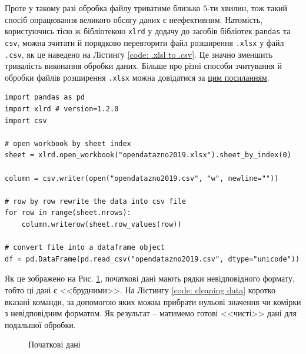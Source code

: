 \vspace{0.4cm}
Проте у такому разі обробка файлу триватиме близько $5$-ти хвилин, тож такий спосіб опрацювання великого 
обсягу даних є неефективним. Натомість, користуючись тією ж бібліотекою \texttt{xlrd} у додачу до засобів 
бібліотек \texttt{pandas} та \texttt{csv}, можна зчитати й порядково перевторити файл розширення \texttt{.xlsx} у файл \texttt{.csv}, як це наведено на Лістингу \ref{code: .xlsl to .csv}. Це значно зменшить тривалість виконання обробки даних. Більше про різні способи зчитування й обробки файлів розширення \texttt{.xlsx} можна довідатися за \href{https://linuxhint.com/read-excel-file-python/}{цим посиланням}.

\newpage
\begin{lstlisting}[firstnumber=16, label = code: .xlsl to .csv, caption = Конвертація у \texttt{.csv} файл]
import pandas as pd
import xlrd # version=1.2.0
import csv
    
# open workbook by sheet index
sheet = xlrd.open_workbook("opendatazno2019.xlsx").sheet_by_index(0)
    
column = csv.writer(open("opendatazno2019.csv", "w", newline=""))
    
# row by row rewrite the data into csv file
for row in range(sheet.nrows):
    column.writerow(sheet.row_values(row))
    
# convert file into a dataframe object
df = pd.DataFrame(pd.read_csv("opendatazno2019.csv", dtype="unicode"))
\end{lstlisting}

\vspace{0.4cm}
Як це зображено на Рис. \ref{figure: initial data}, початкові дані мають рядки невідповідного формату, 
тобто ці дані є <<брудними>>. На Лістингу \ref{code: cleaning data} коротко вказані команди, за допомогою 
яких можна прибрати нульові значення чи комірки з невідповідним форматом. Як результат -- матимемо готові 
<<чисті>> дані для подальшої обробки. 

\begin{figure}[H]
    \caption{Початкові дані}
    \label{figure: initial data}
\end{figure}

